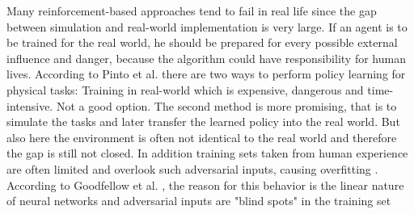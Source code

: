 \begin{comment}
- MOTIVATION
- limitations of random testing --> adversarial approach
- gap between simulation & real world
- model uncert
- adversarial learning is a system which involves focussing on the systems weaknesness
\end{comment}
\begin{comment}

- computer performance, reinforcement learning gets better
- traditional RL fails in real world --> gap between simulation & real world big & not enough training data (set)
- when prepared for real world -> agent should be trained with every potential danger/disturbance to the system
- training sets are limited
- new approach: adversarial reinforcement learning 

//Definition:
-Adversarial training: training the model to malicious input on purpose -> make it more robust to attack, unknown input and reduce test error \cite{MachineLearningAtScale}
- adversarial inputs are "blind spots" in training set \cite{harnessing_goodfellow}
- Linear nature of machine learning is the cause of this \cite{harnessing_goodfellow}
- Agent learns to operate in the presence of a destabilizing adversary -> the adversary agent learns an optimal destabilizing policy --> becomes the "perfect" enemy and generates training data better & broader than a human generated one

-

\end{comment}

Many reinforcement-based approaches tend to fail in real life since the gap between simulation and real-world implementation is very large. If an agent is to be trained for the real world, he should be prepared for every possible external influence and danger, because the algorithm could have responsibility for human lives. According to Pinto et al. \cite{robustPinto2017Mar} there are two ways to perform policy learning for physical tasks: Training in real-world which is expensive, dangerous and time-intensive. Not a good option. The second method is more promising, that is to simulate the tasks and later transfer the learned policy into the real world. But also here the environment is often not identical to the real world and therefore the gap is still not closed. In addition training sets taken from human experience are often limited and overlook such adversarial inputs, causing overfitting \cite{robustPinto2017Mar}. According to Goodfellow et al. \cite{harnessing_goodfellow}, the reason for this behavior is the linear nature of neural networks and adversarial inputs are "blind spots" in the training set 

